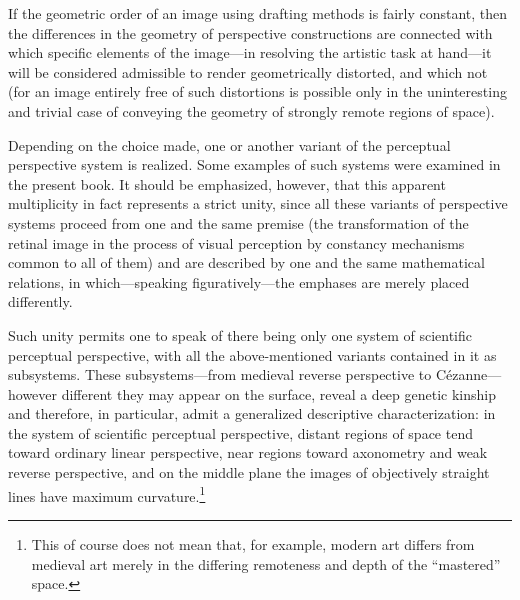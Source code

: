 If the geometric order of an image using drafting methods is fairly constant, then the
differences in the geometry of perspective constructions are connected with which
specific elements of the image---in resolving the artistic task at hand---it will be
considered admissible to render geometrically distorted, and which not (for an image
entirely free of such distortions is possible only in the uninteresting and trivial case
of conveying the geometry of strongly remote regions of space).

Depending on the choice made, one or another variant of the perceptual perspective
system is realized.  Some examples of such systems were examined in the present book.
It should be emphasized, however, that this apparent multiplicity in fact represents a
strict unity, since all these variants of perspective systems proceed from one and the
same premise (the transformation of the retinal image in the process of visual perception
by constancy mechanisms common to all of them) and are described by one and the same
mathematical relations, in which---speaking figuratively---the emphases are merely placed
differently.

Such unity permits one to speak of there being only one system of scientific perceptual
perspective, with all the above-mentioned variants contained in it as subsystems.  These
subsystems---from medieval reverse perspective to Cézanne---however different they may
appear on the surface, reveal a deep genetic kinship and therefore, in particular, admit
a generalized descriptive characterization: in the system of scientific perceptual
perspective, distant regions of space tend toward ordinary linear perspective, near
regions toward axonometry and weak reverse perspective, and on the middle plane the images
of objectively straight lines have maximum curvature.\footnote{This of course does not
  mean that, for example, modern art differs from medieval art merely in the differing
  remoteness and depth of the ``mastered'' space.}


